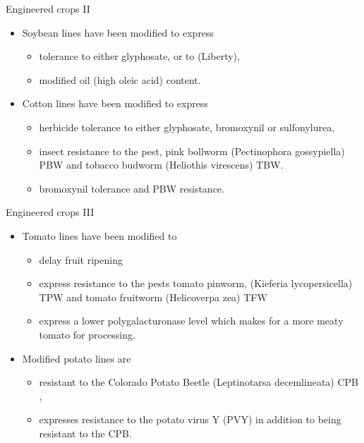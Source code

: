 \documentclass[
  ignorenonframetext,
  aspectratio=169]{beamer}
\providecommand{\tightlist}{%
  \setlength{\itemsep}{0pt}\setlength{\parskip}{0pt}}
\begin{document}
\begin{frame}{Engineered crops II}
\protect\hypertarget{engineered-crops-ii}{}
\begin{itemize}
\tightlist
\item
  Soybean lines have been modified to express

  \begin{itemize}
  \tightlist
  \item
    tolerance to either glyphosate, or to (Liberty),
  \item
    modified oil (high oleic acid) content.
  \end{itemize}
\item
  Cotton lines have been modified to express

  \begin{itemize}
  \tightlist
  \item
    herbicide tolerance to either glyphosate, bromoxynil or
    sulfonylurea,
  \item
    insect resistance to the pest, pink bollworm (Pectinophora
    gossypiella) PBW and tobacco budworm (Heliothis virescens) TBW.
  \item
    bromoxynil tolerance and PBW resistance.
  \end{itemize}
\end{itemize}
\end{frame}

\begin{frame}{Engineered crops III}
\protect\hypertarget{engineered-crops-iii}{}
\begin{itemize}
\tightlist
\item
  Tomato lines have been modified to

  \begin{itemize}
  \tightlist
  \item
    delay fruit ripening
  \item
    express resistance to the pests tomato pinworm, (Kieferia
    lycopersicella) TPW and tomato fruitworm (Helicoverpa zea) TFW
  \item
    express a lower polygalacturonase level which makes for a more meaty
    tomato for processing.
  \end{itemize}
\item
  Modified potato lines are

  \begin{itemize}
  \tightlist
  \item
    resistant to the Colorado Potato Beetle (Leptinotarsa decemlineata)
    CPB ,
  \item
    expresses resistance to the potato virus Y (PVY) in addition to
    being resistant to the CPB.
  \end{itemize}
\end{itemize}
\end{frame}
\end{document}
